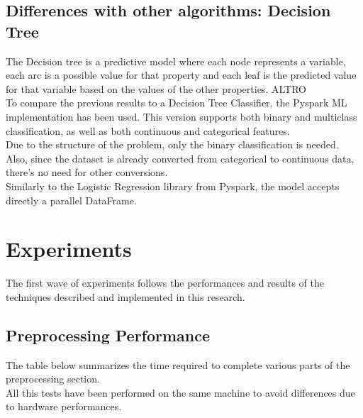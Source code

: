 \documentclass[
	letterpaper, %
	10pt, %
]{class}
\begin{document}
\subsection{Differences with other algorithms: Decision Tree}
The Decision tree is a predictive model where each node represents a variable, each arc is a possible value for that property and each leaf is the predicted value for that variable based on the values of the other properties.
ALTRO\\
To compare the previous results to a Decision Tree Classifier, the Pyspark ML implementation has been used. This version supports both binary and multiclass classification, as well as both continuous and categorical features.\\
Due to the structure of the problem, only the binary classification is needed. Also, since the dataset is already converted from categorical to continuous data, there's no need for other conversions.\\
Similarly to the Logistic Regression library from Pyspark, the model accepts directly a parallel DataFrame.





\section{Experiments}

The first wave of experiments follows the performances and results of the techniques described and implemented in this research.

\subsection{Preprocessing Performance}

The table below summarizes the time required to complete various parts of the preprocessing section.\\
All this tests have been performed on the same machine to avoid differences due to hardware performances.
\end{document}
